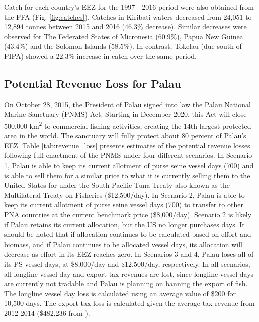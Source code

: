 \documentclass[9p,twocolumn,twoside,lineno]{pnas-new}
\begin{document}
Catch for each country's EEZ for the 1997 - 2016 period were also obtained from the FFA (Fig. \ref{fig:catches}). Catches in Kiribati waters decreased from 24,051 to 12,894 tonnes between 2015 and 2016 (46.3\% decrease). Similar decreases were observed for The Federated States of Micronesia (60.9\%), Papua New Guinea (43.4\%) and the Solomon Islands (58.5\%). In contrast, Tokelau (due south of PIPA) showed a 22.3\% increase in catch over the same period.

\subsection{Potential Revenue Loss for Palau}

On October 28, 2015, the President of Palau signed into law the Palau National Marine Sanctuary (PNMS) Act. Starting in December 2020, this Act will close 500,000 km\textsuperscript{2} to commercial fishing activities, creating the 14th largest protected area in the world. The sanctuary will fully protect about 80 percent of Palau’s EEZ. Table \ref{tab:revenue_loss} presents estimates of the potential revenue losses following full enactment of the PNMS under four different scenarios. In Scenario 1, Palau is able to keep its current allotment of purse seine vessel days (700) and is able to sell them for a similar price to what it is currently selling them to the United States for under the South Pacific Tuna Treaty also known as the Multilateral Treaty on Fisheries (\$12,500/day). In Scenario 2, Palau is able to keep its current allotment of purse seine vessel days (700) to transfer to other PNA countries at the current benchmark price (\$8,000/day). Scenario 2 is likely if Palau retains its current allocation, but the US no longer purchases days.  It should be noted that if allocation continues to be calculated based on effort and biomass, and if Palau continues to be allocated vessel days, its allocation will decrease as effort in its EEZ reaches zero. In Scenarios 3 and 4, Palau loses all of its PS vessel days, at \$8,000/day and \$12,500/day, respectively. In all scenarios, all longline vessel day and export tax revenues are lost, since longline vessel days are currently not tradable and Palau is planning on banning the export of fish. The longline vessel day loss is calculated using an average value of \$200 for 10,500 days. The export tax loss is calculated given the average tax revenue from 2012-2014 (\$482,236  from \cite{Gillett2016}). 


\end{document}
